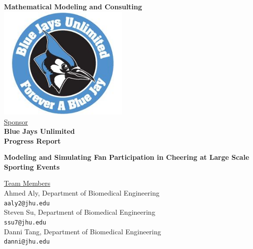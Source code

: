 \documentclass[oneside,12pt]{report}
\begin{document}
\def\thefootnote{\fnsymbol{footnote}}

\thispagestyle{empty}

\def\shiftdowna{0.32in}  %
\def\shiftdownb{0.22in}  %


\begin{center}
\textbf{{\large Mathematical Modeling and Consulting }}\\

\vspace \shiftdowna
\includegraphics[width=2.5in]{BJU.jpg}\\

\vspace \shiftdowna
\underline {Sponsor}\\ 
\vspace{5pt}
\textbf{\large Blue Jays Unlimited} \\
\vspace\shiftdowna
\textbf{{Progress Report}}

\vspace \shiftdowna
\textbf{{\Large Modeling and Simulating Fan Participation in Cheering at Large Scale Sporting Events}}

\vspace{0.35in}
\underline {Team Members}\\
\vspace{5pt}
Ahmed Aly, Department of Biomedical Engineering\\
\texttt{aaly2@jhu.edu} \\
\vspace{5pt}
Steven Su, Department of Biomedical Engineering\\
\texttt{ssu7@jhu.edu} \\
\vspace{5pt}
Danni Tang, Department of Biomedical Engineering\\
\texttt{danni@jhu.edu} \\


\end{center}
\end{document}
